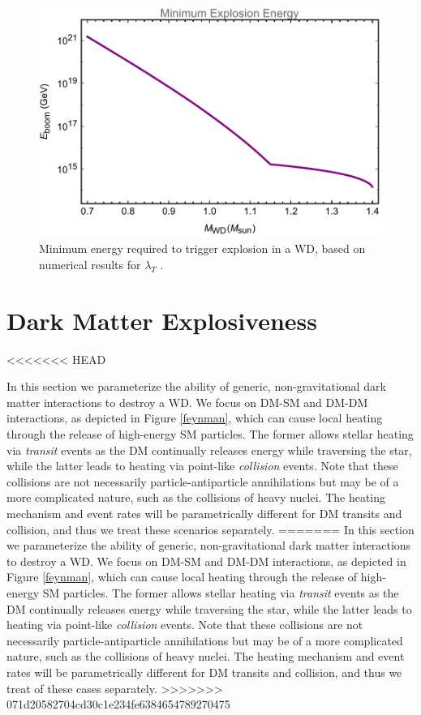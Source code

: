 \documentclass[twocolumn,showpacs,preprintnumbers,amsmath,amssymb,prd]{revtex4}
\begin{document}
\begin{figure}
\includegraphics[scale=.45]{Eboom.pdf}
\caption{Minimum energy required to trigger explosion in a WD, based on numerical results for $\lambda_T$ \cite{Woosley}.}
\label{fig:Eboom}
\end{figure}

\section{Dark Matter Explosiveness}
\label{sec:DMexplode}

<<<<<<< HEAD

In this section we parameterize the ability of generic, non-gravitational dark matter interactions to destroy a WD.  We focus on DM-SM and DM-DM interactions, as depicted in Figure \ref{feynman}, which can cause local heating through the release of high-energy SM particles. The former allows stellar heating via \emph{transit} events as the DM continually releases energy while traversing the star, while the latter leads to heating via point-like \emph{collision} events.  Note that these collisions are not necessarily particle-antiparticle annihilations but may be of a more complicated nature, such as the collisions of heavy nuclei.  The heating mechanism and event rates will be parametrically different for DM transits and collision, and thus we treat these scenarios separately.
=======
In this section we parameterize the ability of generic, non-gravitational dark matter interactions to destroy a WD.  We focus on DM-SM and DM-DM interactions, as depicted in Figure \ref{feynman}, which can cause local heating through the release of high-energy SM particles. The former allows stellar heating via \emph{transit} events as the DM continually releases energy while traversing the star, while the latter leads to heating via point-like \emph{collision} events.  Note that these collisions are not necessarily particle-antiparticle annihilations but may be of a more complicated nature, such as the collisions of heavy nuclei.  The heating mechanism and event rates will be parametrically different for DM transits and collision, and thus we treat of these cases separately. 
>>>>>>> 071d20582704cd30c1e234fe6384654789270475
\end{document}

